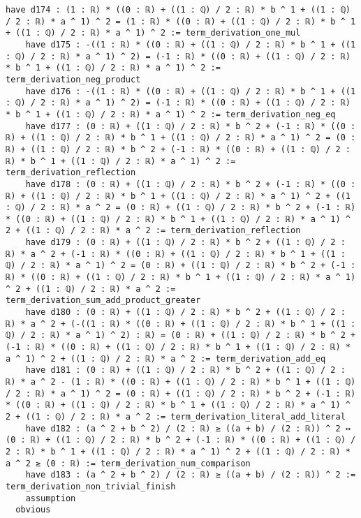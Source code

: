 \documentclass{article}
\begin{document}
\begin{tcolorbox}[colback=white!10, width=\linewidth]
\begin{lstlisting}[language=Lean4]
    have d174 : (1 : ℝ) * ((0 : ℝ) + ((1 : ℚ) / 2 : ℝ) * b ^ 1 + ((1 : ℚ) / 2 : ℝ) * a ^ 1) ^ 2 = (1 : ℝ) * ((0 : ℝ) + ((1 : ℚ) / 2 : ℝ) * b ^ 1 + ((1 : ℚ) / 2 : ℝ) * a ^ 1) ^ 2 := term_derivation_one_mul
    have d175 : -((1 : ℝ) * ((0 : ℝ) + ((1 : ℚ) / 2 : ℝ) * b ^ 1 + ((1 : ℚ) / 2 : ℝ) * a ^ 1) ^ 2) = (-1 : ℝ) * ((0 : ℝ) + ((1 : ℚ) / 2 : ℝ) * b ^ 1 + ((1 : ℚ) / 2 : ℝ) * a ^ 1) ^ 2 := term_derivation_neg_product
    have d176 : -((1 : ℝ) * ((0 : ℝ) + ((1 : ℚ) / 2 : ℝ) * b ^ 1 + ((1 : ℚ) / 2 : ℝ) * a ^ 1) ^ 2) = (-1 : ℝ) * ((0 : ℝ) + ((1 : ℚ) / 2 : ℝ) * b ^ 1 + ((1 : ℚ) / 2 : ℝ) * a ^ 1) ^ 2 := term_derivation_neg_eq
    have d177 : (0 : ℝ) + ((1 : ℚ) / 2 : ℝ) * b ^ 2 + (-1 : ℝ) * ((0 : ℝ) + ((1 : ℚ) / 2 : ℝ) * b ^ 1 + ((1 : ℚ) / 2 : ℝ) * a ^ 1) ^ 2 = (0 : ℝ) + ((1 : ℚ) / 2 : ℝ) * b ^ 2 + (-1 : ℝ) * ((0 : ℝ) + ((1 : ℚ) / 2 : ℝ) * b ^ 1 + ((1 : ℚ) / 2 : ℝ) * a ^ 1) ^ 2 := term_derivation_reflection
    have d178 : (0 : ℝ) + ((1 : ℚ) / 2 : ℝ) * b ^ 2 + (-1 : ℝ) * ((0 : ℝ) + ((1 : ℚ) / 2 : ℝ) * b ^ 1 + ((1 : ℚ) / 2 : ℝ) * a ^ 1) ^ 2 + ((1 : ℚ) / 2 : ℝ) * a ^ 2 = (0 : ℝ) + ((1 : ℚ) / 2 : ℝ) * b ^ 2 + (-1 : ℝ) * ((0 : ℝ) + ((1 : ℚ) / 2 : ℝ) * b ^ 1 + ((1 : ℚ) / 2 : ℝ) * a ^ 1) ^ 2 + ((1 : ℚ) / 2 : ℝ) * a ^ 2 := term_derivation_reflection
    have d179 : (0 : ℝ) + ((1 : ℚ) / 2 : ℝ) * b ^ 2 + ((1 : ℚ) / 2 : ℝ) * a ^ 2 + (-1 : ℝ) * ((0 : ℝ) + ((1 : ℚ) / 2 : ℝ) * b ^ 1 + ((1 : ℚ) / 2 : ℝ) * a ^ 1) ^ 2 = (0 : ℝ) + ((1 : ℚ) / 2 : ℝ) * b ^ 2 + (-1 : ℝ) * ((0 : ℝ) + ((1 : ℚ) / 2 : ℝ) * b ^ 1 + ((1 : ℚ) / 2 : ℝ) * a ^ 1) ^ 2 + ((1 : ℚ) / 2 : ℝ) * a ^ 2 := term_derivation_sum_add_product_greater
    have d180 : (0 : ℝ) + ((1 : ℚ) / 2 : ℝ) * b ^ 2 + ((1 : ℚ) / 2 : ℝ) * a ^ 2 + (-((1 : ℝ) * ((0 : ℝ) + ((1 : ℚ) / 2 : ℝ) * b ^ 1 + ((1 : ℚ) / 2 : ℝ) * a ^ 1) ^ 2) : ℝ) = (0 : ℝ) + ((1 : ℚ) / 2 : ℝ) * b ^ 2 + (-1 : ℝ) * ((0 : ℝ) + ((1 : ℚ) / 2 : ℝ) * b ^ 1 + ((1 : ℚ) / 2 : ℝ) * a ^ 1) ^ 2 + ((1 : ℚ) / 2 : ℝ) * a ^ 2 := term_derivation_add_eq
    have d181 : (0 : ℝ) + ((1 : ℚ) / 2 : ℝ) * b ^ 2 + ((1 : ℚ) / 2 : ℝ) * a ^ 2 - (1 : ℝ) * ((0 : ℝ) + ((1 : ℚ) / 2 : ℝ) * b ^ 1 + ((1 : ℚ) / 2 : ℝ) * a ^ 1) ^ 2 = (0 : ℝ) + ((1 : ℚ) / 2 : ℝ) * b ^ 2 + (-1 : ℝ) * ((0 : ℝ) + ((1 : ℚ) / 2 : ℝ) * b ^ 1 + ((1 : ℚ) / 2 : ℝ) * a ^ 1) ^ 2 + ((1 : ℚ) / 2 : ℝ) * a ^ 2 := term_derivation_literal_add_literal
    have d182 : (a ^ 2 + b ^ 2) / (2 : ℝ) ≥ ((a + b) / (2 : ℝ)) ^ 2 ↔ (0 : ℝ) + ((1 : ℚ) / 2 : ℝ) * b ^ 2 + (-1 : ℝ) * ((0 : ℝ) + ((1 : ℚ) / 2 : ℝ) * b ^ 1 + ((1 : ℚ) / 2 : ℝ) * a ^ 1) ^ 2 + ((1 : ℚ) / 2 : ℝ) * a ^ 2 ≥ (0 : ℝ) := term_derivation_num_comparison
    have d183 : (a ^ 2 + b ^ 2) / (2 : ℝ) ≥ ((a + b) / (2 : ℝ)) ^ 2 := term_derivation_non_trivial_finish
    assumption
  obvious

\end{lstlisting}
\end{tcolorbox}
\end{document}
